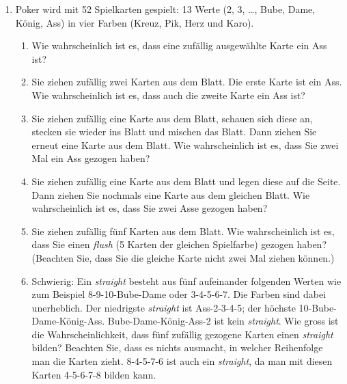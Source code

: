 \documentclass[oneside, 10pt]{book}\usepackage[]{graphicx}\usepackage[]{xcolor}
\begin{document}
\begin{enumerate}
\item Poker wird mit 52 Spielkarten gespielt: 13 Werte (2, 3, \dots, Bube, Dame, König, Ass) in vier Farben (Kreuz, Pik, Herz und Karo).
\begin{enumerate}
\item Wie wahrscheinlich ist es, dass eine zufällig ausgewählte Karte ein Ass ist?
\item Sie ziehen zufällig zwei Karten aus dem Blatt. Die erste Karte ist ein Ass. Wie wahrscheinlich ist es, dass auch die zweite Karte ein Ass ist?
\item Sie ziehen zufällig eine Karte aus dem Blatt, schauen sich diese an, stecken sie wieder ins Blatt und mischen das Blatt. Dann ziehen Sie erneut eine Karte aus dem Blatt. Wie wahrscheinlich ist es, dass Sie zwei Mal ein Ass gezogen haben?
\item Sie ziehen zufällig eine Karte aus dem Blatt und legen diese auf die Seite. Dann ziehen Sie nochmals eine Karte aus dem gleichen Blatt.
Wie wahrscheinlich ist es, dass Sie zwei Asse gezogen haben?
\item Sie ziehen zufällig fünf Karten aus dem Blatt. Wie wahrscheinlich ist es, dass Sie einen \textit{flush} (5 Karten der gleichen Spielfarbe) gezogen haben? (Beachten Sie, dass Sie die gleiche Karte nicht zwei Mal ziehen können.)
\item Schwierig: Ein \textit{straight} besteht aus fünf aufeinander folgenden Werten wie zum Beispiel 8-9-10-Bube-Dame oder 3-4-5-6-7. Die Farben sind dabei unerheblich.
Der niedrigste \textit{straight}
ist Ass-2-3-4-5; der höchste 10-Bube-Dame-König-Ass. Bube-Dame-König-Ass-2 ist kein \textit{straight}.
Wie gross ist die Wahrscheinlichkeit, dass fünf zufällig gezogene Karten einen \textit{straight} bilden? Beachten Sie, dass es nichts ausmacht, in welcher Reihenfolge man die Karten zieht. 8-4-5-7-6 ist auch ein \textit{straight}, da man mit diesen Karten 4-5-6-7-8 bilden kann.%
\end{enumerate}
\end{enumerate}
\end{document}

